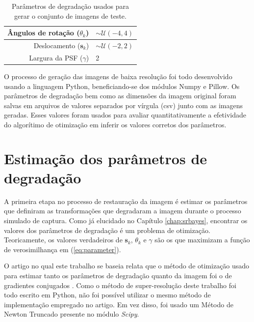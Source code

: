 \begin{table}[h]
	\centering
	\caption{Parâmetros de degradação usados para gerar o conjunto de imagens de teste.}
	\label{tab:resumoParametros}
	\begin{tabular}{r | l}
		Ângulos de rotação ($\theta_k$) & $ \sim \mathcal{U}(-4, 4)$ \\ \hline
		Deslocamento ($\mathbf{s}_k$)& $\sim \mathcal{U}(-2,2)$\\ \hline
		Largura da PSF ($\gamma$) & 2 \\ 

	\end{tabular}
\end{table}

O processo de geração das imagens de baixa resolução foi todo desenvolvido usando a linguagem Python,
beneficiando-se dos módulos Numpy e Pillow.
Os parâmetros de degradação bem como as dimensões da imagem original foram salvas em arquivos de valores separados por vírgula (csv) junto com as imagens geradas.
Esses valores foram usados para avaliar quantitativamente a efetividade do algorítimo de
otimização em inferir os valores corretos dos parâmetros.

\section{Estimação dos parâmetros de degradação}
\label{sec:parestimation}
A primeira etapa no processo de restauração da imagem é estimar os parâmetros que definiram as transformações que degradaram a imagem durante o processo simulado de captura. Como já elucidado no Capítulo \ref{chap:srbayes}, encontrar os valores dos parâmetros de degradação é um problema de otimização.
Teoricamente, os valores verdadeiros de $\mathbf{s}_k$, $\theta_k$ e $\gamma$ são os que maximizam a função de verosimilhança em (\ref{eq:parameter}).


O artigo no qual este trabalho se baseia relata que o método de otimização usado
para estimar tanto os parâmetros de degradação quanto da imagem foi o de gradientes
conjugados \cite{tipping2003bayesian}.
Como o método de super-resolução deste trabalho foi todo escrito em Python,
não foi possível utilizar o mesmo método de implementação empregado no artigo.
Em vez disso, foi usado um Método de Newton Truncado \cite{nocedal1999optimization} presente no módulo \emph{Scipy}.


